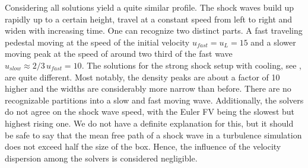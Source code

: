 Considering  all solutions yield a
quite similar profile. The shock waves build up rapidly up to a certain
height, travel at a constant speed from left to right and widen with increasing
time. One can recognize two distinct parts. A fast traveling pedestal moving at
the speed of the initial velocity $u_{fast} = u_L = 15$ and a slower moving
peak at the speed of around two third of the fast wave $u_{slow} \approx
2/3\,u_{fast} = 10$. 
The solutions for the strong shock setup with cooling, see
, are quite different. Most
notably, the density peaks are about a factor of 10 higher and the widths are
considerably more narrow than before. There are no recognizable partitions into a
slow and fast moving wave. Additionally, the solvers do not agree on the shock
wave speed, with the Euler FV  being the slowest but highest rising one. We do
not have a definite explanation for this, but it should be safe to say that the
mean free path of a shock wave in a turbulence simulation does not exceed half
the size of the box. Hence, the influence of the velocity dispersion among the
solvers is considered negligible.



